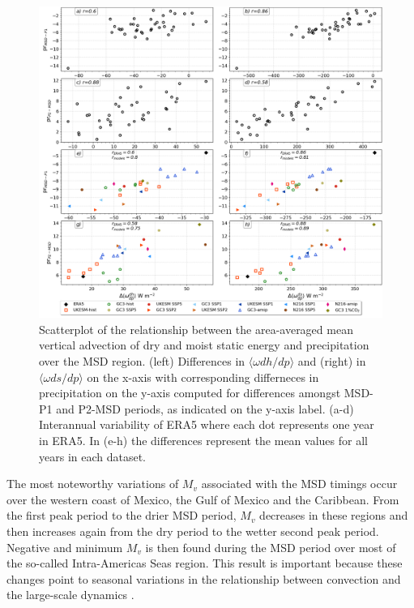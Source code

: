 \begin{figure}[t!]
\includegraphics[width=\linewidth]{figures/thermo_scatter}
\caption[Scatterplot of the vertical advection of dry and moist static energy against precipitation]{Scatterplot of the relationship between the area-averaged mean vertical advection of dry and moist static energy and precipitation over the MSD region. (left) Differences in $\langle \omega dh/dp \rangle$  and (right) in $\langle \omega ds/dp \rangle$ on the x-axis with corresponding differneces in precipitation on the y-axis computed for differences amongst MSD-P1 and P2-MSD periods, as indicated on the y-axis label. (a-d) Interannual variability of ERA5 where each dot represents one year in ERA5.  In (e-h) the differences represent the mean values for all years in each dataset.    }
\label{fig:thermo_scatter}
\end{figure}

 The most noteworthy variations of $M_v$ associated with the MSD timings occur over the western coast of  Mexico, the Gulf of Mexico and the Caribbean. From the first peak period to the drier MSD period, $M_v$ decreases in these regions and then increases again from the dry period to the wetter second peak period. Negative and minimum $M_v$ is then found during the MSD period over most of the so-called Intra-Americas Seas region. This result is important because these changes point to seasonal variations in the relationship between convection and the large-scale dynamics \citep{raymond2009}.

